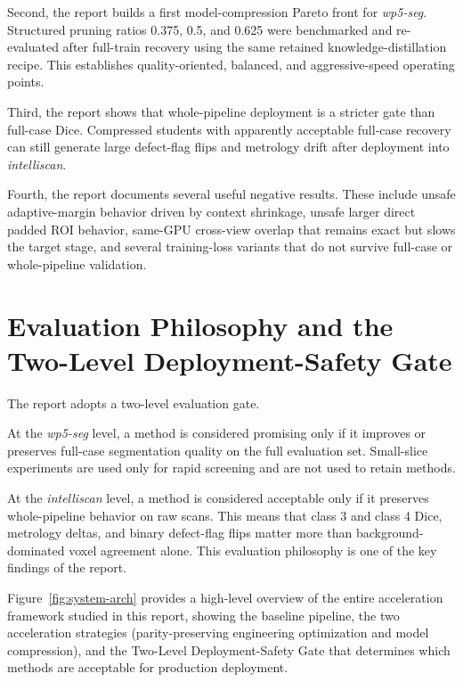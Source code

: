 Second, the report builds a first model-compression Pareto front for
\emph{wp5-seg}. Structured pruning ratios 0.375,
0.5, and 0.625 were benchmarked and re-evaluated after
full-train recovery using the same retained knowledge-distillation
recipe. This establishes quality-oriented, balanced, and
aggressive-speed operating points.

Third, the report shows that whole-pipeline deployment is a stricter
gate than full-case Dice. Compressed students with apparently acceptable
full-case recovery can still generate large defect-flag flips and
metrology drift after deployment into \emph{intelliscan}.

Fourth, the report documents several useful negative results. These
include unsafe adaptive-margin behavior driven by context shrinkage,
unsafe larger direct padded ROI behavior, same-GPU cross-view overlap
that remains exact but slows the target stage, and several training-loss
variants that do not survive full-case or whole-pipeline validation.

\hypertarget{evaluation-philosophy-and-the-two-level-deployment-safety-gate}{%
\section{Evaluation Philosophy and the Two-Level Deployment-Safety
Gate}\label{evaluation-philosophy-and-the-two-level-deployment-safety-gate}}

The report adopts a two-level evaluation gate.

At the \emph{wp5-seg} level, a method is considered promising only if
it improves or preserves full-case segmentation quality on the full
evaluation set. Small-slice experiments are used only for rapid
screening and are not used to retain methods.

At the \emph{intelliscan} level, a method is considered acceptable
only if it preserves whole-pipeline behavior on raw scans. This means
that class 3 and class 4 Dice, metrology deltas, and
binary defect-flag flips matter more than background-dominated voxel
agreement alone. This evaluation philosophy is one of the key findings
of the report.

Figure~\ref{fig:system-arch} provides a high-level overview of the entire acceleration framework studied in this report, showing the baseline pipeline, the two acceleration strategies (parity-preserving engineering optimization and model compression), and the Two-Level Deployment-Safety Gate that determines which methods are acceptable for production deployment.

